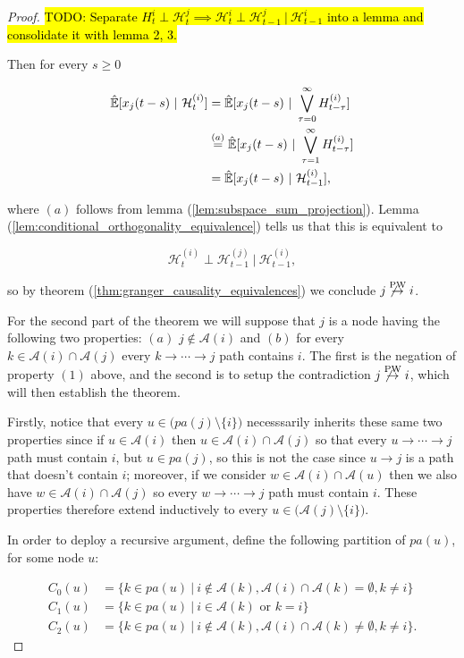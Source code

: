 \documentclass[12pt]{article}
\def\pwgc{\overset{\text{PW}}{\rightarrow}}  %
\def\H{\mathcal{H}}  %
\newcommand{\linE}[2]{\hat{\E}[#1\ |\ #2]}  %
\newcommand{\pa}[1]{pa(#1)}  %
\newcommand{\anc}[1]{\mathcal{A}(#1)}  %
\begin{document}
\begin{proof}
  \hl{TODO: Separate $H_t^i \perp \H_t^j \implies \H_t^i \perp \H_{t - 1}^j\ |\ \H_{t - 1}^i$ into a lemma and consolidate it with lemma 2, 3.}

  Then for every $s \ge 0$

  \begin{align*}
    \linE{x_j(t - s)}{\H_t^{(i)}} &= \linE{x_j(t - s)}{\bigvee_{\tau = 0}^\infty H_{t - \tau}^{(i)}}\\
    &\overset{(a)}{=} \linE{x_j(t - s)}{\bigvee_{\tau = 1}^\infty H_{t - \tau}^{(i)}}\\
    &= \linE{x_j(t - s)}{\H_{t - 1}^{(i)}},
  \end{align*}

  where $(a)$ follows from lemma (\ref{lem:subspace_sum_projection}).  Lemma (\ref{lem:conditional_orthogonality_equivalence}) tells us that this is equivalent to

  \begin{equation*}
    \H_t^{(i)} \perp \H_{t - 1}^{(j)}\ |\ \H_{t - 1}^{(i)},
  \end{equation*}

  so by theorem (\ref{thm:granger_causality_equivalences}) we conclude $j \not\pwgc i$.

  For the second part of the theorem we will suppose that $j$ is a node having the following two properties: $(a)$ $j \not \in \anc{i}$ and $(b)$ for every $k \in \anc{i} \cap \anc{j}$ every $k \rightarrow \cdots \rightarrow j$ path contains $i$.  The first is the negation of property $(1)$ above, and the second is to setup the contradiction $j \not\pwgc i$, which will then establish the theorem.

  Firstly, notice that every $u \in \big(\pa{j} \setminus \{i\}\big)$ necesssarily inherits these same two properties since if $u \in \anc{i}$ then $u \in \anc{i} \cap \anc{j}$ so that every $u \rightarrow \cdots \rightarrow j$ path must contain $i$, but $u \in \pa{j}$, so this is not the case since $u \rightarrow j$ is a path that doesn't contain $i$; moreover, if we consider $w \in \anc{i} \cap \anc{u}$ then we also have $w \in \anc{i} \cap \anc{j}$ so every $w \rightarrow \cdots \rightarrow j$ path must contain $i$.  These properties therefore extend inductively to every $u \in \big(\anc{j} \setminus \{i\}\big)$.

  In order to deploy a recursive argument, define the following partition of $\pa{u}$, for some node $u$:

  \begin{align*}
    C_0(u) &= \{k \in \pa{u}\ |\ i \not\in \anc{k}, \anc{i} \cap \anc{k} = \emptyset, k \ne i\}\\
    C_1(u) &= \{k \in \pa{u}\ |\ i \in \anc{k} \text{ or } k = i\}\\
    C_2(u) &= \{k \in \pa{u}\ |\ i \not\in \anc{k}, \anc{i} \cap \anc{k} \ne \emptyset, k \ne i\}.
  \end{align*}


\end{proof}
\end{document}

